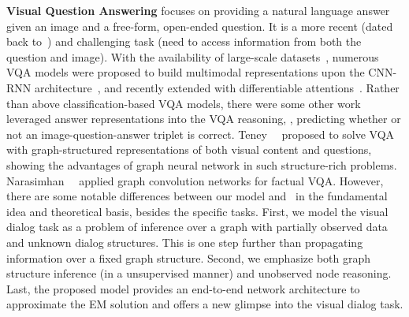 \documentclass[10pt,twocolumn,letterpaper]{article}
\begin{document}
\noindent\textbf{Visual Question Answering} focuses on providing a natural language answer
given an image and a free-form, open-ended question. It is a more recent (dated back to~\cite{malinowski2014multi,Antol_2015_ICCV}) and challenging task (need to access information from both the question and image). With the availability of large-scale datasets~\cite{ren2015exploring,Antol_2015_ICCV,gao2015you,goyal2017making,johnson2017clevr}, numerous VQA models were proposed to build multimodal representations upon the CNN-RNN architecture~\cite{gao2015you,ren2015exploring}, and recently extended with differentiable attentions~\cite{xu2015show,lu2016hierarchical,yang2016stacked,zhu2016visual7w,Anderson_2018_CVPR,Malinowski_2018_ECCV}. Rather than above classification-based VQA models, there were some other work~\cite{shih2016look,jabri2016revisiting,Teney_2018_CVPR,bai2018deep} leveraged answer representations into the VQA reasoning, \ie, predicting whether or not an image-question-answer triplet is correct. Teney~\etal~\cite{teney2017graph} proposed to solve VQA with graph-structured representations of both visual content and questions, showing the advantages of graph neural network in such structure-rich problems. Narasimhan~\etal~\cite{narasimhan2018out} applied graph convolution networks for factual VQA.  However, there are some notable differences between our model and~\cite{teney2017graph,narasimhan2018out} in the fundamental idea and theoretical basis, besides the specific tasks. First, we model the visual dialog task as a problem of inference over a graph with partially observed data and unknown dialog structures. This is one step further than propagating information over a fixed graph structure. Second, we emphasize both graph structure inference (in a unsupervised manner) and unobserved node reasoning. Last, the proposed model provides an end-to-end network architecture to approximate the EM solution and offers a new glimpse into the visual dialog task.
\end{document}
